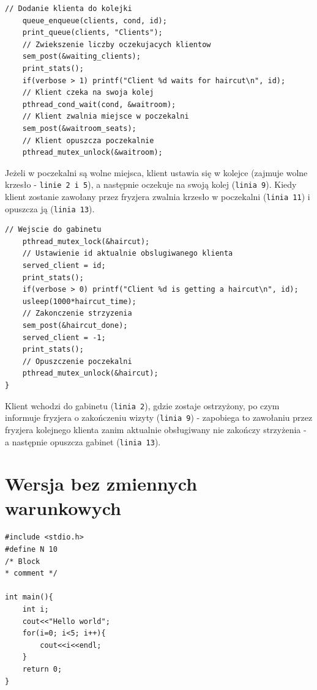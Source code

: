 \documentclass[12pt,a4paper]{article}
\begin{document}
	\begin{center}
		\begin{minipage}{0.8\linewidth}
\begin{lstlisting}[caption = Funkcja klienta 2/3.]
// Dodanie klienta do kolejki
    queue_enqueue(clients, cond, id);
    print_queue(clients, "Clients");
    // Zwiekszenie liczby oczekujacych klientow
    sem_post(&waiting_clients);
    print_stats();
    if(verbose > 1) printf("Client %d waits for haircut\n", id);
    // Klient czeka na swoja kolej
    pthread_cond_wait(cond, &waitroom);
    // Klient zwalnia miejsce w poczekalni
    sem_post(&waitroom_seats);
    // Klient opuszcza poczekalnie
    pthread_mutex_unlock(&waitroom);
\end{lstlisting}
		\end{minipage}
	\end{center}
	
	Jeżeli w poczekalni są wolne miejsca, klient ustawia się w kolejce
	(zajmuje wolne krzesło - \texttt{linie 2 i 5}), a następnie oczekuje
	na swoją kolej (\texttt{linia 9}). Kiedy klient zostanie zawołany
	przez fryzjera zwalnia krzesło w poczekalni (\texttt{linia 11}) i
	opuszcza ją (\texttt{linia 13}).
	
	\begin{center}
		\begin{minipage}{0.8\linewidth}
\begin{lstlisting}[caption = Funkcja klienta 3/3.]
// Wejscie do gabinetu
    pthread_mutex_lock(&haircut);
    // Ustawienie id aktualnie obslugiwanego klienta
    served_client = id;
    print_stats();
    if(verbose > 0) printf("Client %d is getting a haircut\n", id);
    usleep(1000*haircut_time);
    // Zakonczenie strzyzenia
    sem_post(&haircut_done);
    served_client = -1;
    print_stats();
    // Opuszczenie poczekalni
    pthread_mutex_unlock(&haircut);
}
\end{lstlisting}
		\end{minipage}
	\end{center}
	
	Klient wchodzi do gabinetu (\texttt{linia 2}), gdzie zostaje
	ostrzyżony, po czym informuje fryzjera o zakończeniu wizyty
	(\texttt{linia 9}) - zapobiega to zawołaniu przez fryzjera kolejnego
	klienta zanim aktualnie obsługiwany nie zakończy strzyżenia - a 
	następnie opuszcza gabinet (\texttt{linia 13}).
	
		\section{Wersja bez zmiennych warunkowych}
	
	\begin{lstlisting}[label = kod, caption = rak]
#include <stdio.h>
#define N 10
/* Block
* comment */

int main(){
	int i;
	cout<<"Hello world";
	for(i=0; i<5; i++){
		cout<<i<<endl;
	}
	return 0;
}

	\end{lstlisting}
	
	
	
\end{document}
